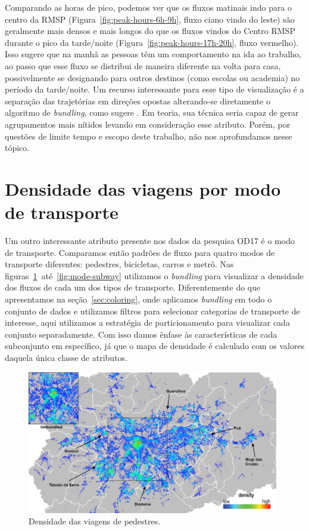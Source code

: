Comparando as horas de pico, podemos ver que os fluxos matinais indo para o
centro da RMSP (Figura~\ref{fig:peak-hours-6h-9h}, fluxo ciano vindo do leste)
são geralmente mais densos e mais longos do que os fluxos vindos do Centro RMSP
durante o pico da tarde/noite (Figura~\ref{fig:peak-hours-17h-20h}, fluxo
vermelho). Isso sugere que na manhã as pessoas têm um comportamento na ida ao
trabalho, ao passo que esse fluxo se distribui de maneira diferente na volta
para casa, possivelmente se designando para outros destinos (como escolas ou
academia) no período da tarde/noite. Um recurso interessante para esse tipo de
visualização é a separação das trajetórias em direções opostas alterando-se
diretamente o algoritmo de \emph{bundling}, como sugere \citet{adeb}. Em teoria,
sua técnica seria capaz de gerar agrupamentos mais nítidos levando em
consideração esse atributo. Porém, por questões de limite tempo e escopo deste
trabalho, não nos aprofundamos nesse tópico.

\section{Densidade das viagens por modo de transporte}
\label{sec:mode}

Um outro interessante atributo presente nos dados da pesquisa OD17 é o modo de
transporte. Comparamos então padrões de fluxo para quatro modos de transporte
diferentes: pedestres, bicicletas, carros e metrô. Nas
figuras~\ref{fig:mode-pedestrian}~até~\ref{fig:mode-subway} utilizamos o
\emph{bundling} para visualizar a densidade dos fluxos de cada um dos tipos de
transporte. Diferentemente do que apresentamos na seção~\ref{sec:coloring}, onde
aplicamos \emph{bundling} em todo o conjunto de dados e utilizamos filtros para
selecionar categorias de transporte de interesse, aqui utilizamos a estratégia de
particionamento para visualizar cada conjunto separadamente. Com isso damos
ênfase às características de cada subconjunto em específico, já que o
mapa de densidade é calculado com os valores daquela única classe de atributos.
 
\begin{figure}[!htb]
  \centering
  \captionsetup{justification=centering}
  \includegraphics[width=0.98\textwidth]{../figuras/mode-pedestrian-density-leg.png}
  \caption{Densidade das viagens de pedestres. \label{fig:mode-pedestrian}}
\end{figure}

